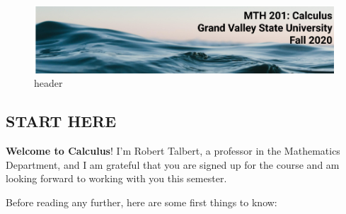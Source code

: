 \documentclass[]{article}
\date{}
\begin{document}
\begin{figure}
\centering
\includegraphics{Calculus-course-header.png}
\caption{header}
\end{figure}

\hypertarget{start-here}{%
\subsection{START HERE}\label{start-here}}

\textbf{Welcome to Calculus}! I'm Robert Talbert, a professor in the
Mathematics Department, and I am grateful that you are signed up for the
course and am looking forward to working with you this semester.

Before reading any further, here are some first things to know:
\end{document}
